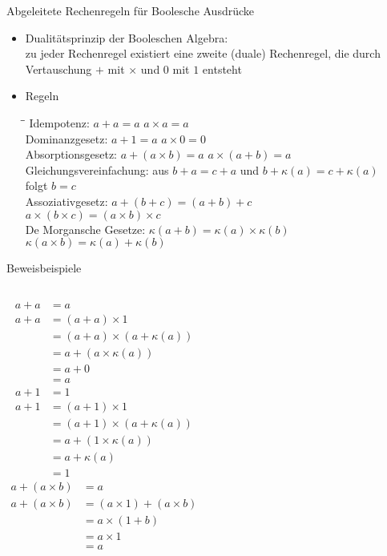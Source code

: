 \begin{frame}{Abgeleitete Rechenregeln für Boolesche Ausdrücke}
	\begin{itemize}
		\item Dualitätsprinzip der Booleschen Algebra:\\
			zu jeder Rechenregel existiert eine zweite (duale) Rechenregel, die durch Vertauschung $+$ mit $\times$ und $0$ mit $1$ entsteht
		\item Regeln\\
		\begin{tabbing}
		\hspace{12em}\=\hspace{8em}\=\kill
		Idempotenz:	\> $a+a=a$  \> $a\times a = a$\\ 
		Dominanzgesetz:	\> $a+1=a$ \> $a\times 0 = 0$\\ 
		Absorptionsgesetz:	\> $a+(a\times b) = a$ \> $a \times (a + b) = a$\\ 
		Gleichungsvereinfachung:	\> aus $b+a=c+a$ und $b+\kappa(a)=c+\kappa(a)$ \\ 
									\> folgt $b=c$ \\ 
		Assoziativgesetz:	\> $a+(b+c)=(a+b)+c$ \\ 
							\> $a\times (b\times c)=(a\times b)\times c$ \\ 
		De Morgansche Gesetze:	\> $\kappa(a+b) = \kappa(a) \times \kappa(b)$ \\ 
								\> $\kappa(a\times b) = \kappa(a) + \kappa(b)$   
		\end{tabbing} 
	\end{itemize}
\end{frame}

\begin{frame}{Beweisbeispiele}
	\begin{columns}
		\begin{align*}
			a+a&=a\\
			a+a&=(a+a)\times 1\\
			   &=(a+a)\times (a+\kappa(a))\\
			   &=a+(a\times \kappa(a))\\
			   &=a+0\\
			   &=a
		\end{align*}
		\begin{align*}
			a+1&=1\\
			a+1&=(a+1)\times 1\\
			&=(a+1)\times (a+\kappa(a))\\
			&=a+(1\times \kappa(a))\\
			&=a+\kappa(a)\\
			&=1
		\end{align*}
		\begin{align*}
			a+(a\times b)&=a\\
			a+(a\times b)&=(a\times 1)+(a\times b)\\
			&=a\times (1+b)\\
			&=a\times 1\\
			&=a
		\end{align*}
	\end{columns}	
\end{frame}